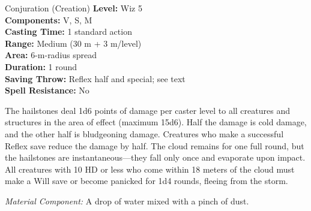 {Conjuration (Creation)}
{
	\textbf{Level:}
	Wiz 5\\
	\textbf{Components:}
	V, S, M\\
	\textbf{Casting Time:}
	1 standard action\\
	\textbf{Range:}
	Medium (30 m + 3 m/level)\\
	\textbf{Area:}
	6-m-radius spread\\
	\textbf{Duration:}
	1 round\\
	\textbf{Saving Throw:}
	Reflex half and special; see text\\
	\textbf{Spell Resistance:}
	No\\
}
{
	The hailstones deal 1d6 points of damage per caster level to all creatures and structures in the area of effect (maximum 15d6). Half the damage is cold damage, and the other half is bludgeoning damage. Creatures who make a successful Reflex save reduce the damage by half. The cloud remains for one full round, but the hailstones are instantaneous---they fall only once and evaporate upon impact. All creatures with 10 HD or less who come within 18 meters of the cloud must make a Will save or become panicked for 1d4 rounds, fleeing from the storm.

	\textit{Material Component:} A drop of water mixed with a pinch of dust.
}
